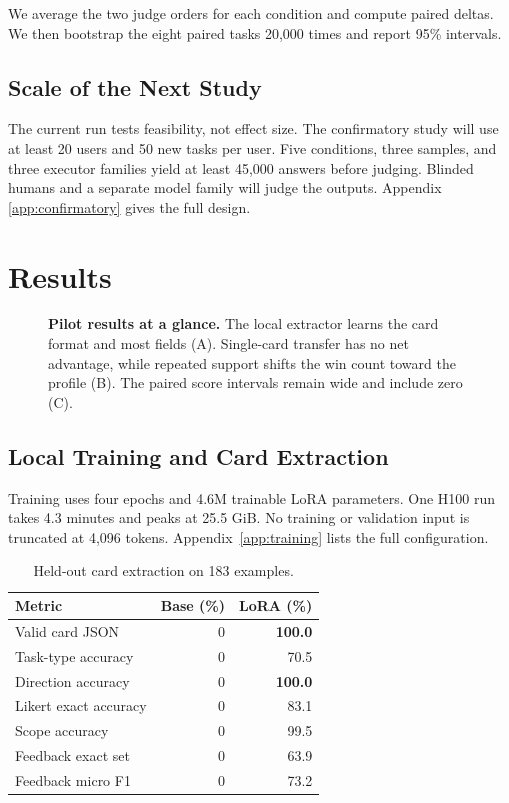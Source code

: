 \documentclass{article}
\begin{document}
We average the two judge orders for each condition and compute paired deltas.
We then bootstrap the eight paired tasks 20,000 times and report 95\%
intervals.

\subsection{Scale of the Next Study}
\label{sec:confirmatory-design}

The current run tests feasibility, not effect size. The confirmatory study will
use at least 20 users and 50 new tasks per user. Five conditions, three samples,
and three executor families yield at least 45,000 answers before judging.
Blinded humans and a separate model family will judge the outputs. Appendix
\ref{app:confirmatory} gives the full design.

\section{Results}
\label{sec:results}

\begin{figure}[t]
\centering
\resizebox{\linewidth}{!}{}
\caption{\textbf{Pilot results at a glance.} The local extractor learns the
card format and most fields (A). Single-card transfer has no net advantage,
while repeated support shifts the win count toward the profile (B). The paired
score intervals remain wide and include zero (C).}
\label{fig:results}
\end{figure}

\subsection{Local Training and Card Extraction}

Training uses four epochs and 4.6M trainable LoRA parameters. One H100 run takes
4.3 minutes and peaks at 25.5 GiB. No training or validation input is truncated
at 4,096 tokens. Appendix~\ref{app:training} lists the full configuration.

\begin{table}[t]
\centering
\small
\caption{Held-out card extraction on 183 examples.}
\label{tab:extractor}
\begin{tabular}{lrr}
\toprule
\rowcolor{pcyan!28}
Metric & Base (\%) & LoRA (\%) \\
\midrule
Valid card JSON & 0 & \textbf{100.0} \\
Task-type accuracy & 0 & 70.5 \\
Direction accuracy & 0 & \textbf{100.0} \\
Likert exact accuracy & 0 & 83.1 \\
Scope accuracy & 0 & 99.5 \\
Feedback exact set & 0 & 63.9 \\
Feedback micro F1 & 0 & 73.2 \\
\bottomrule
\end{tabular}
\end{table}
\end{document}
